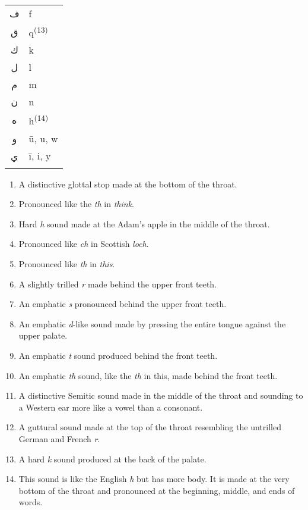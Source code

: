 \documentclass[ebook]{memoir}
\begin{document}
\begin{table}[!h]
{\begin{tabular}{@{}cl@{}}
\textarabic{ف} & {\large f}\\
\textarabic{ق} & {\large q}\textsuperscript{(13)}\\
\textarabic{ك} & {\large k}\\
\textarabic{ل} & {\large l}\\
\textarabic{م} & {\large m}\\
\textarabic{ن} & {\large n}\\
\textarabic{ه} & {\large h}\textsuperscript{(14)}\\
\textarabic{و} & {\large ū, u, w}\\
\textarabic{ي} & {\large ī, i, y}\\
\textarabic{} & {\large }\\
\end{tabular}}
\end{table}
\vspace{-0.95em}
\begin{small}
\begin{enumerate}[leftmargin=*]
\setlength\itemsep{-0.2em}
\item A distinctive glottal stop made at the bottom of the throat.
\item Pronounced like the \textit{th} in \textit{think}.
\item Hard \textit{h} sound made at the Adam’s apple in the middle of the throat.
\item Pronounced like \textit{ch} in Scottish \textit{loch}.
\item Pronounced like \textit{th} in \textit{this}.
\item A slightly trilled \textit{r} made behind the upper front teeth.
\item An emphatic \textit{s} pronounced behind the upper front teeth.
\item An emphatic \textit{d}-like sound made by pressing the entire tongue against the upper palate.
\item An emphatic \textit{t} sound produced behind the front teeth.
\item An emphatic \textit{th} sound, like the \textit{th} in this, made behind the front teeth.
\item A distinctive Semitic sound made in the middle of the throat and sounding to a Western ear more like a vowel than a consonant.
\item A guttural sound made at the top of the throat resembling the untrilled German and French \textit{r}.
\item A hard \textit{k} sound produced at the back of the palate.
\item This sound is like the English \textit{h} but has more body. It is made at the very bottom of the throat and pronounced at the beginning, middle, and ends of words.
\end{enumerate}
\end{small}
\end{document}
